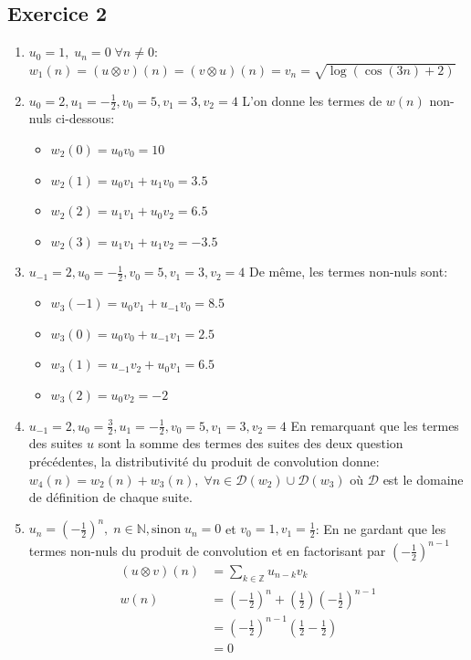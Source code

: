 \subsection*{Exercice 2}
\begin{enumerate}
\item $u_0 = 1, \; u_n = 0 \; \forall n \neq 0$: \newline
$w_1(n) = (u \otimes v)(n) = (v \otimes u)(n) = v_n = \sqrt{\log(\cos(3n)+2)}$ 
\item $u_0 = 2, u_1 = - \frac{1}{2} , v_0 = 5, v_1 = 3, v_2 = 4$ \newline
L'on donne les termes de $w(n)$ non-nuls ci-dessous:
\begin{itemize}
\item $w_2(0) = u_0 v_0 = 10$
\item $w_2(1) = u_0 v_1 + u_1 v_0 = 3.5$
\item $w_2(2) = u_1 v_1 + u_0 v_2 = 6.5$
\item $w_2(3) = u_1 v_1 + u_1 v_2 = - 3.5$
\end{itemize}
\item $u_{-1} = 2, u_0 = - \frac{1}{2} , v_0 = 5, v_1 = 3, v_2 = 4$ \newline
De même, les termes non-nuls sont:
\begin{itemize}
\item $w_3(-1) = u_0 v_1 + u_{-1} v_0 = 8.5$
\item $w_3(0) = u_0 v_0 + u_{-1} v_1 = 2.5$
\item $w_3(1) = u_{-1} v_2 + u_0 v_1 = 6.5$
\item $w_3(2) = u_0 v_2 = -2$
\end{itemize}
\item $u_{-1} = 2, u_0 = \frac{3}{2}, u_1 = - \frac{1}{2}, v_0 = 5, v_1 = 3, v_2 = 4$ \newline 
En remarquant que les termes des suites $u$ sont la somme des termes des suites des deux question précédentes, la distributivité du produit de convolution donne: 
$w_4(n) = w_2(n) + w_3(n), \; \forall n \in \mathcal{D}(w_2) \cup \mathcal{D}(w_3)$ 
où $\mathcal{D}$ est le domaine de définition de chaque suite.
\item $u_n = (-\frac{1}{2})^n, \; n \in \mathbb{N}, \text{sinon} \; u_n = 0$ et $v_0 = 1, v_1 = \frac{1}{2}$: \newline
En ne gardant que les termes non-nuls du produit de convolution et en factorisant par $(-\frac{1}{2})^{n-1}$
\begin{equation*}\begin{split}
(u \otimes v)(n) &= \sum_{k \in \mathbb{Z}} u_{n-k}v_k \\
		w(n)	 &= (-\frac{1}{2})^n + (\frac{1}{2})(-\frac{1}{2})^{n-1} \\
				 &= (-\frac{1}{2})^{n-1}(\frac{1}{2}-\frac{1}{2}) \\
				 &= 0
\end{split}\end{equation*}
\end{enumerate}



